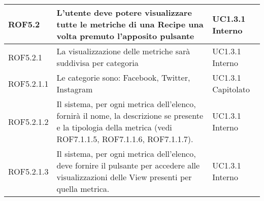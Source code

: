 \begin{center}
\begin{longtable}{| p{2.5cm} | p{8cm} | p{2cm} |}
		\hline
		ROF5.2  &  L'utente deve potere visualizzare tutte le metriche di una Recipe una volta premuto l'apposito pulsante  &  UC1.3.1 \newline Interno \\
		\hline
		ROF5.2.1  &  La visualizzazione delle metriche sarà suddivisa per categoria  &  UC1.3.1 \newline Interno \\
		\hline
		ROF5.2.1.1  &  Le categorie sono: Facebook, Twitter, Instagram &  UC1.3.1 \newline Capitolato \\
		\hline
		ROF5.2.1.2  &  Il sistema, per ogni metrica dell'elenco, fornirà il nome, la descrizione se presente e la tipologia della metrica (vedi ROF7.1.1.5, ROF7.1.1.6, ROF7.1.1.7). &  UC1.3.1 \newline Interno \\
		\hline
		ROF5.2.1.3  &  Il sistema, per ogni metrica dell'elenco, deve fornire il pulsante per accedere alle visualizzazioni delle View presenti per quella metrica. &  UC1.3.1 \newline Interno \\
		\hline


\end{longtable}
\end{center}
